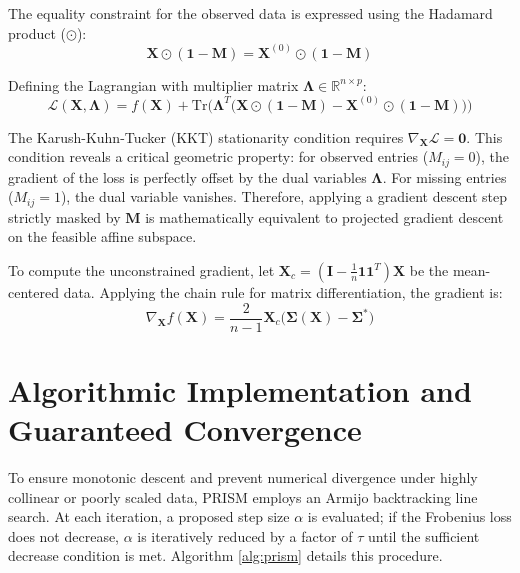 \documentclass[11pt]{article}
\begin{document}
The equality constraint for the observed data is expressed using the Hadamard product ($\odot$):
$$ \bm{X} \odot (\bm{1} - \bm{M}) = \bm{X}^{(0)} \odot (\bm{1} - \bm{M}) $$

Defining the Lagrangian with multiplier matrix $\bm{\Lambda} \in \mathbb{R}^{n \times p}$:
$$ \mathcal{L}(\bm{X}, \bm{\Lambda}) = f(\bm{X}) + \text{Tr}\Big( \bm{\Lambda}^T \big( \bm{X} \odot (\bm{1} - \bm{M}) - \bm{X}^{(0)} \odot (\bm{1} - \bm{M}) \big) \Big) $$

The Karush-Kuhn-Tucker (KKT) stationarity condition requires $\nabla_{\bm{X}} \mathcal{L} = \mathbf{0}$. This condition reveals a critical geometric property: for observed entries ($M_{ij} = 0$), the gradient of the loss is perfectly offset by the dual variables $\bm{\Lambda}$. For missing entries ($M_{ij} = 1$), the dual variable vanishes. Therefore, applying a gradient descent step strictly masked by $\bm{M}$ is mathematically equivalent to projected gradient descent on the feasible affine subspace.

To compute the unconstrained gradient, let $\bm{X}_c = (\bm{I} - \frac{1}{n}\bm{1}\bm{1}^T)\bm{X}$ be the mean-centered data. Applying the chain rule for matrix differentiation, the gradient is:
$$ \nabla_{\bm{X}} f(\bm{X}) = \frac{2}{n-1} \bm{X}_c \big( \bm{\Sigma}(\bm{X}) - \bm{\Sigma}^* \big) $$

\section{Algorithmic Implementation and Guaranteed Convergence}
To ensure monotonic descent and prevent numerical divergence under highly collinear or poorly scaled data, PRISM employs an Armijo backtracking line search. At each iteration, a proposed step size $\alpha$ is evaluated; if the Frobenius loss does not decrease, $\alpha$ is iteratively reduced by a factor of $\tau$ until the sufficient decrease condition is met. Algorithm \ref{alg:prism} details this procedure.
\end{document}
